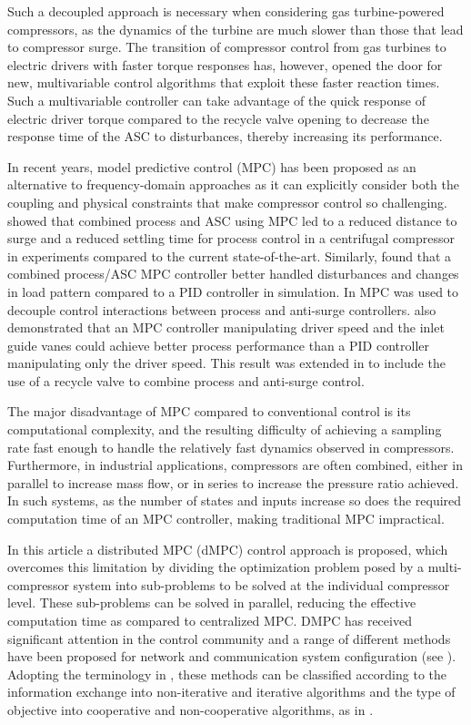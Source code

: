 Such a decoupled approach is necessary when considering gas turbine-powered compressors, as the dynamics of the turbine are much slower than those that lead to compressor surge.
The transition of compressor control from gas turbines to electric drivers with faster torque responses has, however, opened the door for new, multivariable control algorithms that exploit these faster reaction times.
Such a multivariable controller can take advantage of the quick response of electric driver torque compared to the recycle valve opening to decrease the response time of the ASC to disturbances, thereby increasing its performance.

In recent years, model predictive control (MPC) has been proposed as an alternative to frequency-domain approaches as it can explicitly consider both the coupling and physical constraints that make compressor control so challenging.
\cite{Cortinovis2015} showed that combined process and ASC using MPC led to a reduced distance to surge and a reduced settling time for process control in a centrifugal compressor in experiments compared to the current state-of-the-art.
Similarly, \cite{Budinis2015} found that a combined process/ASC MPC controller better handled disturbances and changes in load pattern compared to a PID controller in simulation.
In \cite{Mercangoz2016} MPC was used to decouple control interactions between process and anti-surge controllers.
\cite{Bentaleb2014} also demonstrated that an MPC controller manipulating driver speed and the inlet guide vanes could achieve better process performance than a PID controller manipulating only the driver speed.
This result was extended in \cite{Bentaleb2015} to include the use of a recycle valve to combine process and anti-surge control.

The major disadvantage of MPC compared to conventional control is its computational complexity, and the resulting difficulty of achieving a sampling rate fast enough to handle the relatively fast dynamics observed in compressors.
Furthermore, in industrial applications, compressors are often combined, either in parallel to increase mass flow, or in series to increase the pressure ratio achieved.
In such systems, as the number of states and inputs increase so does the required computation time of an MPC controller, making traditional MPC impractical.

In this article a distributed MPC (dMPC) control approach is proposed, which overcomes this limitation by dividing the optimization problem posed by a multi-compressor system into sub-problems to be solved at the individual compressor level.
These sub-problems can be solved in parallel, reducing the effective computation time as compared to centralized MPC.
DMPC has received significant attention in the control community and a range of different methods have been proposed for network and communication system configuration (see \cite{Camponogara2002, Venkat2007}).
Adopting the terminology in \cite{Scattolini2009}, these methods can be classified according to the information exchange into non-iterative and iterative algorithms and the type of objective into cooperative and non-cooperative algorithms, as in \cite{Zeilinger2013}.

